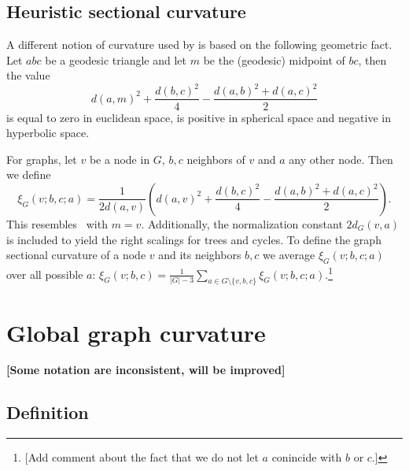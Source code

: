 \documentclass{article} %
\begin{document}
\subsection{Heuristic sectional curvature}

A different notion of curvature used by \citep{gu2019learning} is based on the following geometric fact. 
Let $abc$ be a geodesic triangle and let $m$ be the (geodesic) midpoint of $bc$, then the value
\begin{equation}\label{eq:parallelogram_law}
	d(a,m)^2 + \frac{d(b,c)^2}{4} - \frac{d(a,b)^2 + d(a,c)^2}{2}
\end{equation}
is equal to zero in euclidean space, is positive in spherical space and negative in hyperbolic space.

For graphs, let $v$ be a node in $G$, $b,c$ neighbors of $v$ and $a$ any other node. Then we define
\begin{equation}
\xi_G(v;b,c;a) = \frac{1}{2 d(a,v)} \left( 	d(a,v)^2 + \frac{d(b,c)^2}{4} - \frac{d(a,b)^2 + d(a,c)^2}{2} \right).
\end{equation}
This resembles~ with $m = v$. Additionally, the normalization constant $2d_G(v,a)$ is included to yield the right scalings for trees and cycles.
To define the graph sectional curvature of a node $v$ and its neighbors $b,c$ we average $\xi_G(v;b,c;a)$ over all possible $a$: 
$\xi_G(v; b,c) = \frac{1}{|G|-3} \sum_{a \in G\setminus \{v,b,c\}} \xi_G(v;b,c;a)$.\footnote{[Add comment about the fact that we do not let $a$ conincide with $b$ or $c$.]}


\section{Global graph curvature}

\textbf{[Some notation are inconsistent, will be improved]}

\subsection{Definition}
\end{document}
